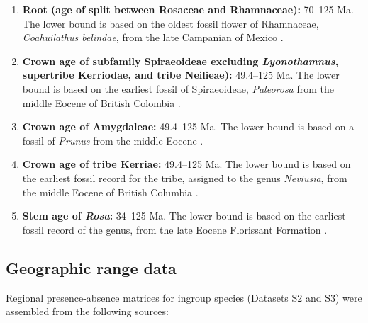\begin{enumerate}
\item \textbf{Root (age of split between Rosaceae and Rhamnaceae):}
  70--125 Ma. The lower bound is based on the oldest fossil flower
  of Rhamnaceae, \textit{Coahuilathus belindae}, from the late
  Campanian of Mexico \citep{Calvillo-Canadell2007}.

\item \textbf{Crown age of subfamily Spiraeoideae excluding
    \textit{Lyonothamnus}, supertribe Kerriodae, and tribe Neilieae):}
  49.4--125 Ma. The lower bound is based on the earliest fossil of
  Spiraeoideae, \textit{Paleorosa} from the middle Eocene of British
  Colombia \citep{Basinger1976}.

\item \textbf{Crown age of Amygdaleae:} 49.4--125 Ma. The lower
  bound is based on a fossil of \textit{Prunus} from the middle Eocene
  \citep{DeVore2007}.

\item \textbf{Crown age of tribe Kerriae:} 49.4--125 Ma. The lower
  bound is based on the earliest fossil record for the tribe, assigned
  to the genus \textit{Neviusia}, from the middle Eocene of British
  Columbia \citep{DeVore2004}.

\item \textbf{Stem age of \textit{Rosa}:} 34--125 Ma. The lower bound
  is based on the earliest fossil record of the genus, from the late
  Eocene Florissant Formation \citep{Manchester2001}.
\end{enumerate}

\subsection*{Geographic range data}

Regional presence-absence matrices for ingroup species (Datasets S2
and S3) were assembled from the following sources:

